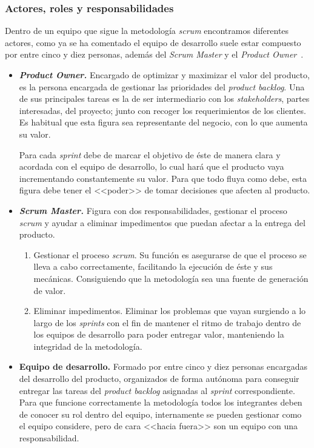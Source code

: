\subsubsection{Actores, roles y responsabilidades}
Dentro de un equipo que sigue la metodología \textit{scrum} encontramos diferentes actores, como ya se ha comentado el equipo de desarrollo suele estar compuesto por entre cinco y diez personas, además del \textit{Scrum Master} y el \textit{Product Owner}~\cite{julioroche_2020}.
\begin{itemize}
\item \textbf{\textit{Product Owner.}} Encargado de optimizar y maximizar el valor del producto, es la persona encargada de gestionar las prioridades del \textit{product backlog}. Una de sus principales tareas es la de ser intermediario con los \textit{stakeholders}, partes interesadas, del proyecto; junto con recoger los requerimientos de los clientes. Es habitual que esta figura sea representante del negocio, con lo que aumenta su valor.

Para cada \textit{sprint} debe de marcar el objetivo de éste de manera clara y acordada con el equipo de desarrollo, lo cual hará que el producto vaya incrementando constantemente su valor. Para que todo fluya como debe, esta figura debe tener el <<poder>> de tomar decisiones que afecten al producto.

\item \textbf{\textit{Scrum Master.}} Figura con dos responsabilidades, gestionar el proceso \textit{scrum} y ayudar a eliminar impedimentos que puedan afectar a la entrega del producto.
\begin{enumerate}
\item Gestionar el proceso \textit{scrum}. Su función es asegurarse de que el proceso se lleva a cabo correctamente, facilitando la ejecución de éste y sus mecánicas. Consiguiendo que la metodología sea una fuente de generación de valor.
\item Eliminar impedimentos. Eliminar los problemas que vayan surgiendo a lo largo de los \textit{sprints} con el fin de mantener el ritmo de trabajo dentro de los equipos de desarrollo para poder entregar valor, manteniendo la integridad de la metodología.
\end{enumerate}
\item \textbf{Equipo de desarrollo.} Formado por entre cinco y diez personas encargadas del desarrollo del producto, organizados de forma autónoma para conseguir entregar las tareas del \textit{product backlog} asignadas al \textit{sprint} correspondiente. Para que funcione correctamente la metodología todos los integrantes deben de conocer su rol dentro del equipo, internamente se pueden gestionar como el equipo considere, pero de cara <<hacia fuera>> son un equipo con una responsabilidad.
\end{itemize}

